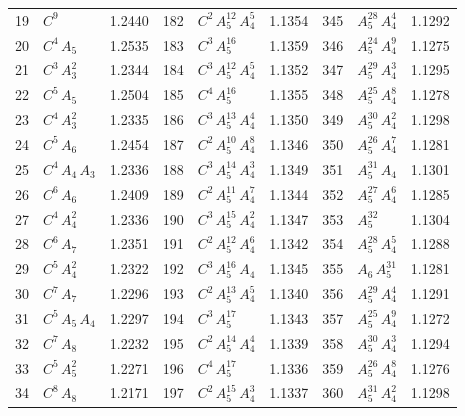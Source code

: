 \begin{longtable}{@{}rlr@{\quad}rlr@{\quad}rlr@{}}
19 & $C^{9}$ & 1.2440 & 182 & $C^{2}$\,$A_{5}^{12}$\,$A_{4}^{5}$ & 1.1354 & 345 & $A_{5}^{28}$\,$A_{4}^{4}$ & 1.1292 \\
20 & $C^{4}$\,$A_{5}$ & 1.2535 & 183 & $C^{3}$\,$A_{5}^{16}$ & 1.1359 & 346 & $A_{5}^{24}$\,$A_{4}^{9}$ & 1.1275 \\
21 & $C^{3}$\,$A_{3}^{2}$ & 1.2344 & 184 & $C^{3}$\,$A_{5}^{12}$\,$A_{4}^{5}$ & 1.1352 & 347 & $A_{5}^{29}$\,$A_{4}^{3}$ & 1.1295 \\
22 & $C^{5}$\,$A_{5}$ & 1.2504 & 185 & $C^{4}$\,$A_{5}^{16}$ & 1.1355 & 348 & $A_{5}^{25}$\,$A_{4}^{8}$ & 1.1278 \\
23 & $C^{4}$\,$A_{3}^{2}$ & 1.2335 & 186 & $C^{3}$\,$A_{5}^{13}$\,$A_{4}^{4}$ & 1.1350 & 349 & $A_{5}^{30}$\,$A_{4}^{2}$ & 1.1298 \\
24 & $C^{5}$\,$A_{6}$ & 1.2454 & 187 & $C^{2}$\,$A_{5}^{10}$\,$A_{4}^{8}$ & 1.1346 & 350 & $A_{5}^{26}$\,$A_{4}^{7}$ & 1.1281 \\
25 & $C^{4}$\,$A_{4}$\,$A_{3}$ & 1.2336 & 188 & $C^{3}$\,$A_{5}^{14}$\,$A_{4}^{3}$ & 1.1349 & 351 & $A_{5}^{31}$\,$A_{4}$ & 1.1301 \\
26 & $C^{6}$\,$A_{6}$ & 1.2409 & 189 & $C^{2}$\,$A_{5}^{11}$\,$A_{4}^{7}$ & 1.1344 & 352 & $A_{5}^{27}$\,$A_{4}^{6}$ & 1.1285 \\
27 & $C^{4}$\,$A_{4}^{2}$ & 1.2336 & 190 & $C^{3}$\,$A_{5}^{15}$\,$A_{4}^{2}$ & 1.1347 & 353 & $A_{5}^{32}$ & 1.1304 \\
28 & $C^{6}$\,$A_{7}$ & 1.2351 & 191 & $C^{2}$\,$A_{5}^{12}$\,$A_{4}^{6}$ & 1.1342 & 354 & $A_{5}^{28}$\,$A_{4}^{5}$ & 1.1288 \\
29 & $C^{5}$\,$A_{4}^{2}$ & 1.2322 & 192 & $C^{3}$\,$A_{5}^{16}$\,$A_{4}$ & 1.1345 & 355 & $A_{6}$\,$A_{5}^{31}$ & 1.1281 \\
30 & $C^{7}$\,$A_{7}$ & 1.2296 & 193 & $C^{2}$\,$A_{5}^{13}$\,$A_{4}^{5}$ & 1.1340 & 356 & $A_{5}^{29}$\,$A_{4}^{4}$ & 1.1291 \\
31 & $C^{5}$\,$A_{5}$\,$A_{4}$ & 1.2297 & 194 & $C^{3}$\,$A_{5}^{17}$ & 1.1343 & 357 & $A_{5}^{25}$\,$A_{4}^{9}$ & 1.1272 \\
32 & $C^{7}$\,$A_{8}$ & 1.2232 & 195 & $C^{2}$\,$A_{5}^{14}$\,$A_{4}^{4}$ & 1.1339 & 358 & $A_{5}^{30}$\,$A_{4}^{3}$ & 1.1294 \\
33 & $C^{5}$\,$A_{5}^{2}$ & 1.2271 & 196 & $C^{4}$\,$A_{5}^{17}$ & 1.1336 & 359 & $A_{5}^{26}$\,$A_{4}^{8}$ & 1.1276 \\
34 & $C^{8}$\,$A_{8}$ & 1.2171 & 197 & $C^{2}$\,$A_{5}^{15}$\,$A_{4}^{3}$ & 1.1337 & 360 & $A_{5}^{31}$\,$A_{4}^{2}$ & 1.1298 \\

\end{longtable}
